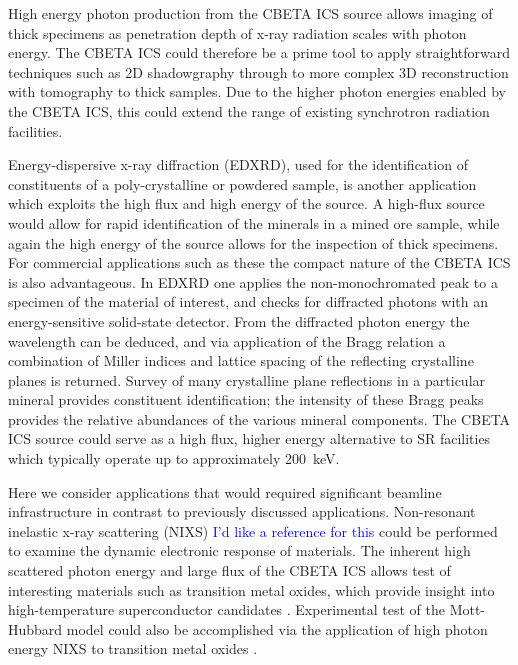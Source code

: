 \documentclass[../main.tex]{subfiles}
\begin{document}
High energy photon production from the CBETA ICS source allows imaging of thick specimens as penetration depth of x-ray radiation scales with photon energy. The CBETA ICS could therefore be a prime tool to apply straightforward techniques such as 2D shadowgraphy through to more complex 3D reconstruction with tomography \cite{als2011elements} to thick samples. Due to the higher photon energies enabled by the CBETA ICS, this could extend the range of existing synchrotron radiation facilities.

Energy-dispersive x-ray diffraction (EDXRD), used for the identification of constituents of a poly-crystalline or powdered sample, is another application which exploits the high flux and high energy of the source. A high-flux source would allow for rapid identification of the minerals in a mined ore sample, while again the high energy of the source allows for the inspection of thick specimens. For commercial applications such as these the compact nature of the CBETA ICS is also advantageous. In EDXRD \cite{kampfe2005energy} one applies the non-monochromated peak to a specimen of the material of interest, and checks for diffracted photons with an energy-sensitive solid-state detector. From the diffracted photon energy the wavelength can be deduced, and via application of the Bragg relation a combination of Miller indices and lattice spacing of the reflecting crystalline planes is returned. Survey of many crystalline plane reflections in a particular mineral provides constituent identification; the intensity of these Bragg peaks provides the relative abundances of the various mineral components. The CBETA ICS source could serve as a high flux, higher energy alternative to SR facilities \cite{CHESSstructuralmaterialsbeamline} which typically operate up to approximately 200~\si{\kilo\electronvolt}. 

Here we consider applications that would required significant beamline infrastructure in contrast to  previously discussed applications. Non-resonant inelastic x-ray scattering (NIXS) \textcolor{blue}{I'd like a reference for this} could be performed to examine the dynamic electronic response of materials. The inherent high scattered photon energy and large flux  of the CBETA ICS allows test of interesting materials such as transition metal oxides, which provide insight into high-temperature superconductor candidates \cite{hasan2002momentum,isaacs1996inelastic}. Experimental test of the Mott-Hubbard model \cite{hubbard1963electron,mott1949basis} could also be accomplished via the application of high photon energy NIXS to transition metal oxides \cite{isaacs1996resonant}.
\end{document}
